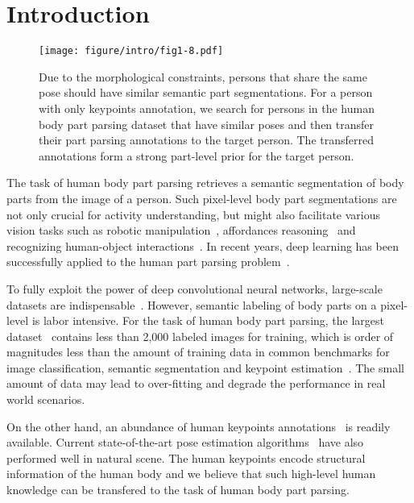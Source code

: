 \documentclass[10pt,twocolumn,letterpaper]{article}
\begin{document}
\vspace{-3mm}
\section{Introduction}
\begin{figure}[t]
\begin{center}
\texttt{[image: figure/intro/fig1-8.pdf]}
\end{center}
\vspace{-3mm}
   \caption{Due to the morphological constraints, persons that share the same pose should have similar semantic part segmentations. For a person with only keypoints annotation, we search for persons in the human body part parsing dataset that have similar poses and then transfer their part parsing annotations to the target person. The transferred annotations form a strong part-level prior for the target person.}
\label{fig:intro}
\vspace{-3mm}
\end{figure}

The task of human body part parsing retrieves a semantic segmentation of body parts from the image of a person. Such pixel-level body part segmentations are not only crucial for activity understanding, but might also facilitate various vision tasks such as robotic manipulation~\cite{ekvall2004interactive}, affordances reasoning~\cite{koppula2013learning} and recognizing human-object interactions~\cite{deepparts}. In recent years, deep learning has been successfully applied to the human part parsing problem~\cite{chen2015deeplab,chen2016attention,xia2016zoom}.

To fully exploit the power of deep convolutional neural networks, large-scale datasets are indispensable~\cite{imagenet_cvpr09}. However, semantic labeling of body parts on a pixel-level is labor intensive. For the task of human body part parsing, the largest dataset~\cite{chen2014detect} contains less than 2,000 labeled images for training, which is order of magnitudes less than the amount of training data in common benchmarks for image classification, semantic segmentation and keypoint estimation~\cite{imagenet_cvpr09,lin2014microsoft,Everingham15}. The small amount of data may lead to over-fitting and degrade the performance in real world scenarios.

On the other hand, an abundance of human keypoints annotations~\cite{andriluka14cvpr} is readily available. Current state-of-the-art pose estimation algorithms~\cite{newell2016stacked} have also performed well in natural scene. The human keypoints encode structural information of the human body and we believe that such high-level human knowledge can be transfered to the task of human body part parsing.
\end{document}
